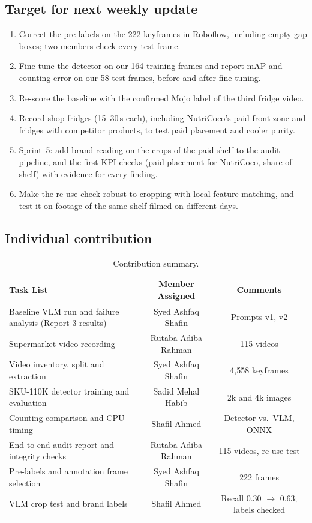 \subsection{Target for next weekly update}
\begin{enumerate}
  \item Correct the pre-labels on the 222 keyframes in Roboflow, including empty-gap boxes; two
  members check every test frame.
  \item Fine-tune the detector on our 164 training frames and report mAP and counting error on our
  58 test frames, before and after fine-tuning.
  \item Re-score the baseline with the confirmed Mojo label of the third fridge video.
  \item Record shop fridges (15--30\,s each), including NutriCoco's paid front zone and fridges with
  competitor products, to test paid placement and cooler purity.
  \item Sprint~5: add brand reading on the crops of the paid shelf to the audit pipeline, and the first
  KPI checks (paid placement for NutriCoco, share of shelf) with evidence for every finding.
  \item Make the re-use check robust to cropping with local feature matching, and test it on footage
  of the same shelf filmed on different days.
\end{enumerate}

\subsection{Individual contribution}
\begin{table}[!h]
\centering
\caption{Contribution summary.}
\begin{tabular}{lcc}
\hline
Task List & Member Assigned & Comments \\
\hline
Baseline VLM run and failure analysis (Report 3 results) & Syed Ashfaq Shafin & Prompts v1, v2 \\
Supermarket video recording & Rutaba Adiba Rahman & 115 videos \\
Video inventory, split and extraction & Syed Ashfaq Shafin & 4{,}558 keyframes \\
SKU-110K detector training and evaluation & Sadid Mehal Habib & 2k and 4k images \\
Counting comparison and CPU timing & Shafil Ahmed & Detector vs.\ VLM, ONNX \\
End-to-end audit report and integrity checks & Rutaba Adiba Rahman & 115 videos, re-use test \\
Pre-labels and annotation frame selection & Syed Ashfaq Shafin & 222 frames \\
VLM crop test and brand labels & Shafil Ahmed & Recall 0.30 $\rightarrow$ 0.63; labels checked \\
\hline
\end{tabular}
\end{table}
